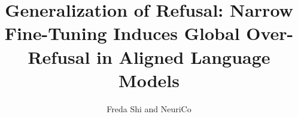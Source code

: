 \documentclass{article}
\author{Freda Shi and NeuriCo}
\title{Generalization of Refusal: Narrow Fine-Tuning Induces Global Over-Refusal in Aligned Language Models}
\begin{document}
\maketitle

\begin{abstract}

\end{abstract}









\end{document}
